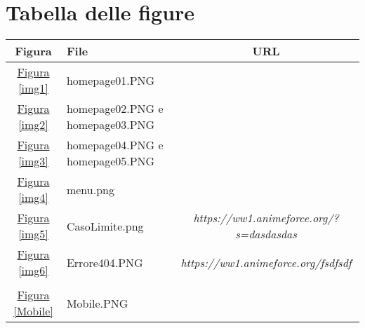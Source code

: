 \section{Tabella delle figure}

\begin{center}
	\begin{tabularx}{\textwidth}{|c|X|c|}
		\hline
		\textbf{Figura} & \textbf{File} &\textbf{URL} \\ \hline
		\hyperref[img1]{Figura \ref{img1}} & homepage01.PNG 					& \linkSito \\ \hline
		\hyperref[img2]{Figura \ref{img2}} & homepage02.PNG e homepage03.PNG 	& \linkSito \\ \hline
		\hyperref[img3]{Figura \ref{img3}} & homepage04.PNG e homepage05.PNG 	& \linkSito \\ \hline
		\hyperref[img4]{Figura \ref{img4}} & menu.png 		& \linkSito \\ \hline
		\hyperref[img5]{Figura \ref{img5}} & CasoLimite.png	& \textit{https://ww1.animeforce.org/?s=dasdasdas} \\ \hline
		\hyperref[img6]{Figura \ref{img6}} & Errore404.PNG  & \textit{https://ww1.animeforce.org/fsdfsdf}\\ \hline
		
		
		 &  &  \\ \hline
		 
	 
		\hyperref[Mobile]{Figura \ref{Mobile}} & Mobile.PNG & \linkSito \\ \hline
	
	\end{tabularx}
	
\end{center}